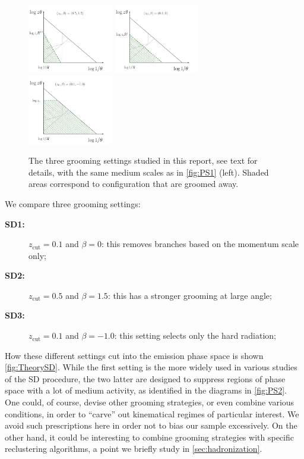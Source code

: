 \begin{figure}[t!]
\centering
\includegraphics[width=0.33\textwidth]{figures/kinematics/plotVac_SD1_2}%
\includegraphics[width=0.33\textwidth]{figures/kinematics/plotVac_SD2_2}%
\includegraphics[width=0.33\textwidth]{figures/kinematics/plotVac_SD3_2}%
\caption{The three grooming settings studied in this report, see text for details, with the same medium scales as in \autoref{fig:PS1} (left). Shaded areas correspond to configuration that are groomed away.}
\label{fig:TheorySD}
\end{figure}
We compare three grooming settings:
\begin{description}
\item[{\bf SD1:}] $z_{\text{cut}}=0.1$ and $\beta=0$: this removes branches based on the momentum scale only;
\item[{\bf SD2:}]  $z_{\text{cut}}=0.5$ and $\beta=1.5$: this has a stronger grooming at large angle;
\item[{\bf SD3:}]  $z_{\text{cut}}=0.1$ and $\beta=-1.0$: this setting selects only the hard radiation;
\end{description}
How these different settings cut into the emission phase space is shown \autoref{fig:TheorySD}. While the first setting is the more widely used in various studies of the SD procedure, the two latter are designed to suppress regions of phase space with a lot of medium activity, as identified in the diagrams in \autoref{fig:PS2}. One could, of course, devise other grooming strategies, or even combine various conditions, in order to ``carve'' out kinematical regimes of particular interest. We avoid such prescriptions here in order not to bias our sample excessively. On the other hand, it could be interesting to combine grooming strategies with specific reclustering algorithms, a point we briefly study in \autoref{sec:hadronization}.

